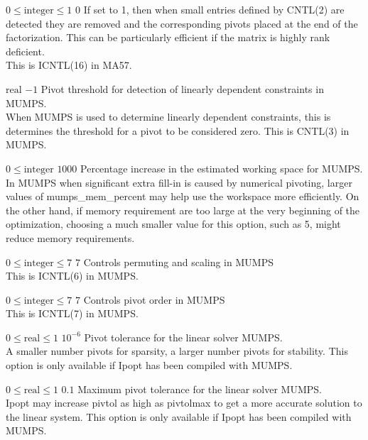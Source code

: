 %
{$0\leq\textrm{integer}\leq1$}%
{$0$}%
{If set to 1, then when small entries defined by CNTL(2) are detected they are removed and the corresponding pivots placed at the end of the factorization.  This can be particularly efficient if the matrix is highly rank deficient.\\
This is ICNTL(16) in MA57.}%
{}

%
{$\textrm{real}$}%
{$-1$}%
{Pivot threshold for detection of linearly dependent constraints in MUMPS.\\
When MUMPS is used to determine linearly dependent constraints, this is determines the threshold for a pivot to be considered zero.  This is CNTL(3) in MUMPS.}%
{}

%
{$0\leq\textrm{integer}$}%
{$1000$}%
{Percentage increase in the estimated working space for MUMPS.\\
In MUMPS when significant extra fill-in is caused by numerical pivoting, larger values of mumps\_mem\_percent may help use the workspace more efficiently.  On the other hand, if memory requirement are too large at the very beginning of the optimization, choosing a much smaller value for this option, such as 5, might reduce memory requirements.}%
{}

%
{$0\leq\textrm{integer}\leq7$}%
{$7$}%
{Controls permuting and scaling in MUMPS\\
This is ICNTL(6) in MUMPS.}%
{}

%
{$0\leq\textrm{integer}\leq7$}%
{$7$}%
{Controls pivot order in MUMPS\\
This is ICNTL(7) in MUMPS.}%
{}

%
{$0\leq\textrm{real}\leq1$}%
{$10^{- 6}$}%
{Pivot tolerance for the linear solver MUMPS.\\
A smaller number pivots for sparsity, a larger number pivots for stability.  This option is only available if Ipopt has been compiled with MUMPS.}%
{}

%
{$0\leq\textrm{real}\leq1$}%
{$0.1$}%
{Maximum pivot tolerance for the linear solver MUMPS.\\
Ipopt may increase pivtol as high as pivtolmax to get a more accurate solution to the linear system.  This option is only available if Ipopt has been compiled with MUMPS.}%
{}

